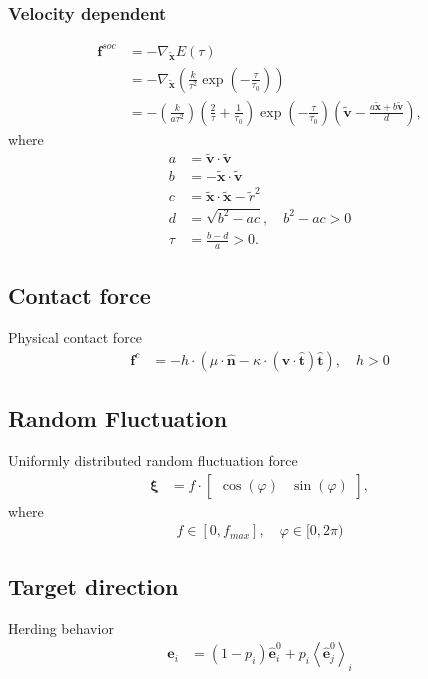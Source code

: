 \subsubsection{Velocity dependent}
\begin{align}
\mathbf{f}^{soc} &= -\nabla_{\tilde{\mathbf{x}}} E(\tau)  \\
&= -\nabla_{\tilde{\mathbf{x}}} \left(\frac{k}{\tau^{2}} \exp \left( -\frac{\tau}{\tau_{0}} \right) \right) \\
&= - \left(\frac{k}{a \tau^{2}}\right) 
\left(\frac{2}{\tau} + \frac{1}{\tau_{0}}\right) 
\exp\left (-\frac{\tau}{\tau_{0}}\right )
\left(\tilde{\mathbf{v}} -\frac{a \tilde{\mathbf{x}} + b \tilde{\mathbf{v}}}{d} \right),
\end{align}
where
\begin{align}
a &= \tilde{\mathbf{v}} \cdot \tilde{\mathbf{v}} \\
b &= -\tilde{\mathbf{x}} \cdot \tilde{\mathbf{v}} \\
c &= \tilde{\mathbf{x}} \cdot \tilde{\mathbf{x}} - \tilde{r}^{2} \\
d &= \sqrt{b^{2} - a c}, \quad b^{2} - a c > 0 \\
\tau &= \frac{b - d}{a} > 0.
\end{align}


\subsection{Contact force}
Physical contact force
\begin{align}
\mathbf{f}^{c} &= - h \cdot \left(\mu \cdot \hat{\mathbf{n}} - \kappa \cdot (\mathbf{v} \cdot \hat{\mathbf{t}}) \hat{\mathbf{t}}\right), \quad h > 0
\end{align}


\subsection{Random Fluctuation}
Uniformly distributed random fluctuation force
\begin{align}
\boldsymbol{\xi} &= f \cdot \begin{bmatrix} \cos(\varphi) & \sin(\varphi) \end{bmatrix},
\end{align}
where
\begin{align}
f \in [0, f_{max}],\quad \varphi \in [0, 2 \pi)
\end{align}


\subsection{Target direction}
Herding behavior
\begin{align}
\mathbf{e}_{i} &= (1 - p_{i}) \hat{\mathbf{e}}_{i}^{0} + p_{i} \left\langle \hat{\mathbf{e}}_{j}^{0} \right\rangle_{i}
\end{align}